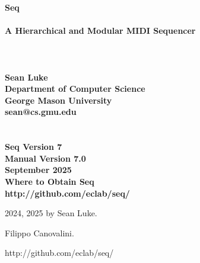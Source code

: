 \documentclass[twoside,10pt]{article}
\newcommand\booktitle{Seq\\~\vspace{0em}\\\LARGE A Hierarchical and Modular MIDI Sequencer\\}
\newcommand\reference[1]{\vspace{0.5em}\hfill{\parbox{6in}{\raggedleft\noindent\textsf{#1}}}}
\begin{document}

\noindent\Huge\bf \booktitle\\
\\
\\
\Large\bf Sean Luke\\
{\large\rm 
Department of Computer Science\\
George Mason University\\
sean@cs.gmu.edu}\\
\\
\\
\large\rm {\bf Seq Version 7}\\
\large\rm {\bf Manual Version 7.0}\\
\large\rm  September 2025\\

\vspace{5in}
\noindent\Large\bf Where to Obtain Seq\\
\large\rm http:/\!/github.com/eclab/seq/

\clearpage

\small 
{}  2024, 2025 by Sean Luke.

\vspace{0.25in}
 Filippo Canovalini.

\vspace{0.25in}


\reference{http:/\!/github.com/eclab/seq/}

\vspace{0.15in}
\end{document}
